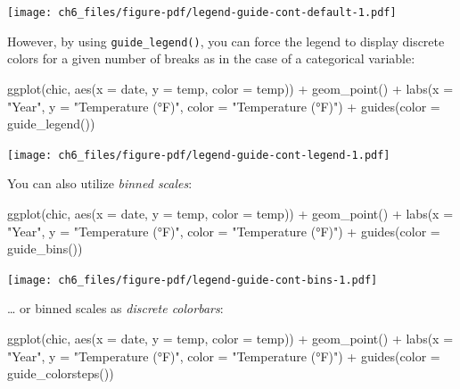 \documentclass[
  letterpaper,
]{scrbook}
\newenvironment{Shaded}{\begin{snugshade}}{\end{snugshade}}
\newcommand{\AttributeTok}[1]{\textcolor[rgb]{0.40,0.45,0.13}{#1}}
\newcommand{\FunctionTok}[1]{\textcolor[rgb]{0.28,0.35,0.67}{#1}}
\newcommand{\NormalTok}[1]{\textcolor[rgb]{0.00,0.23,0.31}{#1}}
\newcommand{\SpecialCharTok}[1]{\textcolor[rgb]{0.37,0.37,0.37}{#1}}
\newcommand{\StringTok}[1]{\textcolor[rgb]{0.13,0.47,0.30}{#1}}
\begin{document}
\texttt{[image: ch6\_files/figure-pdf/legend-guide-cont-default-1.pdf]}

However, by using \texttt{guide\_legend()}, you can force the legend to
display discrete colors for a given number of breaks as in the case of a
categorical variable:

\begin{Shaded}
\begin{Highlighting}[]
\FunctionTok{ggplot}\NormalTok{(chic,}
       \FunctionTok{aes}\NormalTok{(}\AttributeTok{x =}\NormalTok{ date, }\AttributeTok{y =}\NormalTok{ temp, }\AttributeTok{color =}\NormalTok{ temp)) }\SpecialCharTok{+}
  \FunctionTok{geom\_point}\NormalTok{() }\SpecialCharTok{+}
  \FunctionTok{labs}\NormalTok{(}\AttributeTok{x =} \StringTok{"Year"}\NormalTok{, }\AttributeTok{y =} \StringTok{"Temperature (°F)"}\NormalTok{, }\AttributeTok{color =} \StringTok{"Temperature (°F)"}\NormalTok{) }\SpecialCharTok{+}
  \FunctionTok{guides}\NormalTok{(}\AttributeTok{color =} \FunctionTok{guide\_legend}\NormalTok{())}
\end{Highlighting}
\end{Shaded}

\texttt{[image: ch6\_files/figure-pdf/legend-guide-cont-legend-1.pdf]}

You can also utilize \emph{\emph{binned scales}}:

\begin{Shaded}
\begin{Highlighting}[]
\FunctionTok{ggplot}\NormalTok{(chic,}
       \FunctionTok{aes}\NormalTok{(}\AttributeTok{x =}\NormalTok{ date, }\AttributeTok{y =}\NormalTok{ temp, }\AttributeTok{color =}\NormalTok{ temp)) }\SpecialCharTok{+}
  \FunctionTok{geom\_point}\NormalTok{() }\SpecialCharTok{+}
  \FunctionTok{labs}\NormalTok{(}\AttributeTok{x =} \StringTok{"Year"}\NormalTok{, }\AttributeTok{y =} \StringTok{"Temperature (°F)"}\NormalTok{, }\AttributeTok{color =} \StringTok{"Temperature (°F)"}\NormalTok{) }\SpecialCharTok{+}
  \FunctionTok{guides}\NormalTok{(}\AttributeTok{color =} \FunctionTok{guide\_bins}\NormalTok{())}
\end{Highlighting}
\end{Shaded}

\texttt{[image: ch6\_files/figure-pdf/legend-guide-cont-bins-1.pdf]}

\ldots{} or binned scales as \emph{\emph{discrete colorbars}}:

\begin{Shaded}
\begin{Highlighting}[]
\FunctionTok{ggplot}\NormalTok{(chic,}
       \FunctionTok{aes}\NormalTok{(}\AttributeTok{x =}\NormalTok{ date, }\AttributeTok{y =}\NormalTok{ temp, }\AttributeTok{color =}\NormalTok{ temp)) }\SpecialCharTok{+}
  \FunctionTok{geom\_point}\NormalTok{() }\SpecialCharTok{+}
  \FunctionTok{labs}\NormalTok{(}\AttributeTok{x =} \StringTok{"Year"}\NormalTok{, }\AttributeTok{y =} \StringTok{"Temperature (°F)"}\NormalTok{, }\AttributeTok{color =} \StringTok{"Temperature (°F)"}\NormalTok{) }\SpecialCharTok{+}
  \FunctionTok{guides}\NormalTok{(}\AttributeTok{color =} \FunctionTok{guide\_colorsteps}\NormalTok{())}
\end{Highlighting}
\end{Shaded}
\end{document}

